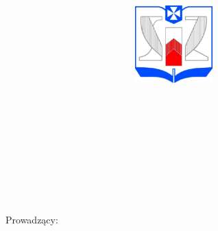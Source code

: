 
\noindent
\parbox{65mm}{\includegraphics[width=13.0cm, height=3.0cm]{logoWSIiZ}}

\vspace{10mm}
\begin{center}
{\Large{}\textbf{\wydzial}}
\end{center}
\vspace{10mm}
\noindent
\hspace{30mm}{\Large{}\textbf{\kierunek}}\\

\noindent
\hspace{30mm}{\Large{}\textbf{\specjalnosc}}
\vspace{30mm}
\begin{center}
	{\large{}\autor}\\
	{\large{}\album}\\
	{\large{}\autordwa}\\
	{\large{}\albumdwa}\\
	{\large{}\autortrzy}\\
	{\large{}\albumtrzy}\\
	\vspace{15pt}
	{\huge{}\textbf{\textit{\temat}}}\\
	\vspace{20pt}
	{\normalsize{}Prowadzący: \promotor}\\
	\vspace{90pt}
	{\LARGE{}\textbf{\typpracy}}\\
	\vspace{180pt}
	{\large{}\textbf{\miasto {} \rok}}
\end{center}

\thispagestyle{empty}

\newpage
\text{}

\thispagestyle{empty}
\newpage


\tableofcontents
\thispagestyle{empty}
\newpage

